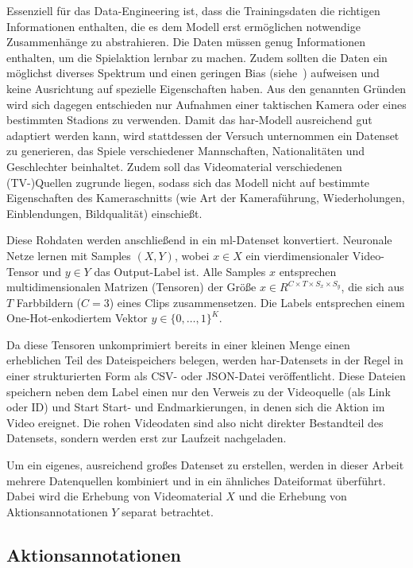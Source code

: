 Essenziell für das Data-Engineering ist, dass die Trainingsdaten die richtigen Informationen enthalten, die es dem Modell erst ermöglichen notwendige Zusammenhänge zu abstrahieren.
Die Daten müssen genug Informationen enthalten, um die Spielaktion lernbar zu machen.
Zudem sollten die Daten ein möglichst diverses Spektrum und einen geringen Bias (siehe~\cite{Gugger20}) aufweisen und keine Ausrichtung auf spezielle Eigenschaften haben.
Aus den genannten Gründen wird sich dagegen entschieden nur Aufnahmen einer taktischen Kamera oder eines bestimmten Stadions zu verwenden.
Damit das \gls{har}-Modell ausreichend gut adaptiert werden kann, wird stattdessen der Versuch unternommen ein Datenset zu generieren, das Spiele verschiedener Mannschaften, Nationalitäten und Geschlechter beinhaltet.
Zudem soll das Videomaterial verschiedenen (TV-)Quellen zugrunde liegen, sodass sich das Modell nicht auf bestimmte Eigenschaften des Kameraschnitts (wie Art der Kameraführung, Wiederholungen, Einblendungen, Bildqualität) einschießt.

Diese Rohdaten werden anschließend in ein \gls{ml}-Datenset konvertiert.
Neuronale Netze lernen mit Samples $(X, Y)$, wobei $x \in X$ ein vierdimensionaler Video-Tensor und $y \in Y$ das Output-Label ist.
Alle Samples $x$ entsprechen multidimensionalen Matrizen (Tensoren) der Größe $x \in R^{C \times T \times S_x \times S_y}$, die sich aus $T$ Farbbildern ($C=3$) eines Clips zusammensetzen.
Die Labels entsprechen einem One-Hot-enkodiertem Vektor $y \in \{0, \dots, 1\}^K$.

Da diese Tensoren unkomprimiert bereits in einer kleinen Menge einen erheblichen Teil des Dateispeichers belegen, werden \gls{har}-Datensets in der Regel in einer strukturierten Form als CSV- oder JSON-Datei veröffentlicht.
Diese Dateien speichern neben dem Label einen nur den Verweis zu der Videoquelle (als Link oder ID) und Start \ggf Start- und Endmarkierungen, in denen sich die Aktion im Video ereignet.
Die rohen Videodaten sind also nicht direkter Bestandteil des Datensets, sondern werden erst zur Laufzeit nachgeladen.

Um ein eigenes, ausreichend großes Datenset zu erstellen, werden in dieser Arbeit mehrere Datenquellen kombiniert und in ein ähnliches Dateiformat überführt.
Dabei wird die Erhebung von Videomaterial $X$ und die Erhebung von Aktionsannotationen $Y$ separat betrachtet.

\subsection{Aktionsannotationen}
\label{subsec:aktionsannotationen}

